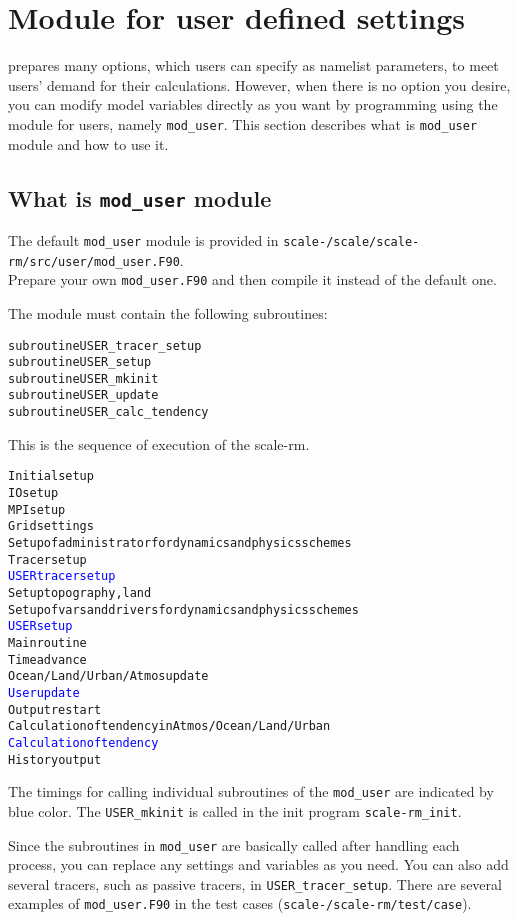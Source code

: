 \section{Module for user defined settings} \label{sec:mod_user}

\scalerm prepares many options, which users can specify as namelist parameters, to meet users' demand for their calculations.
However, when there is no option you desire,
you can modify model variables directly as you want by programming using the module for users, namely \verb|mod_user|.
This section describes what is \verb|mod_user| module and how to use it.


\subsection{What is \texttt{mod\_user} module}

The default \verb|mod_user| module is provided in \texttt{scale-{\version}/scale/scale-rm/src/user/mod\_user.F90}.\\
Prepare your own \verb|mod_user.F90| and then compile it instead of the default one.

The module must contain the following subroutines:
\begin{alltt}
  subroutine USER_tracer_setup
  subroutine USER_setup
  subroutine USER_mkinit
  subroutine USER_update
  subroutine USER_calc_tendency
\end{alltt}

\noindent This is the sequence of execution of the scale-rm.
\begin{alltt}
Initial setup
  IO setup
  MPI setup
  Grid settings
  Setup of administrator for dynamics and physics schemes 
  Tracer setup
  \textcolor{blue}{USER tracer setup}
  Setup topography, land
  Setup of vars and drivers for dynamics and physics schemes 
  \textcolor{blue}{USER setup}
Main routine
  Time advance
  Ocean/Land/Urban/Atmos update
  \textcolor{blue}{User update}
  Output restart
  Calculation of tendency in Atmos/Ocean/Land/Urban
  \textcolor{blue}{Calculation of tendency}
  History output
\end{alltt}
The timings for calling individual subroutines of the \verb|mod_user| are indicated by blue color.
The \verb|USER_mkinit| is called in the init program \verb|scale-rm_init|.


Since the subroutines in \verb|mod_user| are basically called after handling each process,
you can replace any settings and variables as you need.
You can also add several tracers, such as passive tracers, in \verb|USER_tracer_setup|.
There are several examples of \verb|mod_user.F90| in the test cases (\texttt{scale-{\version}/scale-rm/test/case}).



